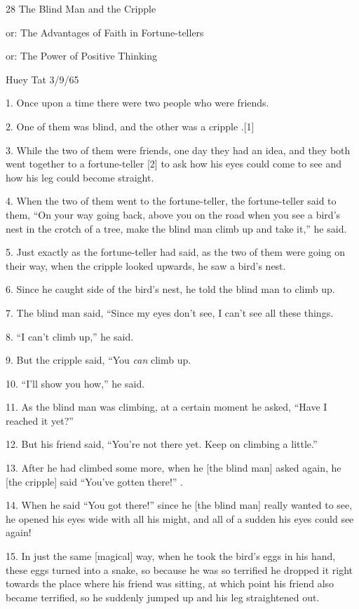 
{\LARGE{}28 The Blind Man and the Cripple}

{\LARGE{}or: The Advantages of Faith in Fortune-tellers}

{\LARGE{}or: The Power of Positive Thinking}

{\LARGE{}Huey Tat 3/9/65}

{\LARGE{}1. Once upon a time there were two people who were friends.}

{\LARGE{}2. One of them was blind, and the other was a cripple .[1]}

{\LARGE{}3. While the two of them were friends, one day they had an idea, and they
both went together to a fortune-teller [2] to ask how his eyes could come to see
and how his leg could become straight.}

{\LARGE{}4. When the two of them went to the fortune-teller, the fortune-teller
said to them, ``On your way going back, above you on the road when you see a bird's
nest in the crotch of a tree, make the blind man climb up and take it,'' he said.}

{\LARGE{}5. Just exactly as the fortune-teller had said, as the two of them were
going on their way, when the cripple looked upwards, he saw a bird's nest.}

{\LARGE{}6. Since he caught side of the bird's nest, he told the blind man to climb
up.}

{\LARGE{}7. The blind man said, ``Since my eyes don't see, I can't see all these
things.}

{\LARGE{}8. ``I can't climb up,'' he said.}

{\LARGE{}9. But the cripple said, ``You }{\LARGE{}\textit{can}}{\LARGE{} climb
up.}

{\LARGE{}10. ``I'll show you how,'' he said.}

{\LARGE{}11. As the blind man was climbing, at a certain moment he asked, ``Have
I reached it yet?''}

{\LARGE{}12. But his friend said, ``You're not there yet.  Keep on climbing a little.''}

{\LARGE{}13. After he had climbed some more, when he [the blind man] asked again,
he [the cripple] said ``You've gotten there!'' .}

{\LARGE{}14. When he said ``You got there!'' since he [the blind man] really wanted
to see, he opened his eyes wide with all his might, and all of a sudden his eyes
could see again!}

{\LARGE{}15. In just the same [magical] way, when he took the bird's eggs in his
hand, these eggs turned into a snake, so because he was so terrified he dropped
it right towards the place where his friend was sitting, at which point his friend
also became terrified, so he suddenly jumped up and his leg straightened out.}


